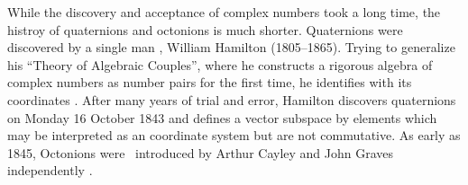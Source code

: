 \documentclass[a4paper,12pt]{book}
\begin{document}
While the discovery and acceptance of complex numbers took a long time, the
histroy of quaternions and octonions is much shorter. Quaternions were
discovered by a single man \cite{ham}, William Hamilton (1805--1865). Trying
to generalize his ``Theory of Algebraic Couples'', where he constructs a
rigorous algebra of complex numbers as number pairs for the first time, he
identifies \coordHE{} with its \coordHE{} coordinates \coordHE{}.
After many years of trial and error, Hamilton discovers quaternions on
Monday 16 October 1843 and defines a vector subspace \coordHE{} by elements
which may be interpreted as an \coordHE{} coordinate system \coordHE{} but \coordHE{} are not commutative. As early as 1845, Octonions
were \ introduced by Arthur Cayley and John Graves independently \cite{gra}%
\cite{cay}.
\end{document}
